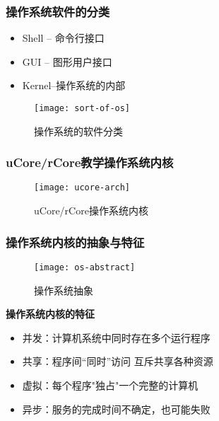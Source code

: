 %
%
%
%

\begin{frame}[plain]
	\frametitle{操作系统软件的分类}
		\begin{itemize}
		\item Shell -- 命令行接口
		\item GUI -- 图形用户接口
		\item Kernel--操作系统的内部
	\end{itemize}
	\begin{figure}
		\centering
		\texttt{[image: sort-of-os]}
		\caption{操作系统的软件分类}
	\end{figure}
\end{frame}

\begin{frame}[plain]
	\frametitle{uCore/rCore教学操作系统内核}
	\begin{figure}
		\centering
		\texttt{[image: ucore-arch]}
		\caption{uCore/rCore操作系统内核}
	\end{figure}
\end{frame}



\begin{frame}[plain]
	\frametitle{操作系统内核的抽象与特征}
	\begin{figure}
	\centering
	\texttt{[image: os-abstract]}
	\caption{操作系统抽象}
\end{figure} %
	\textbf{操作系统内核的特征}
	\begin{itemize}
		\item 并发：计算机系统中同时存在多个运行程序 %
		\item 共享：程序间“同时”访问 互斥共享各种资源 %
		\item 虚拟：每个程序"独占"一个完整的计算机 %
		\item 异步：服务的完成时间不确定，也可能失败
	\end{itemize}

\end{frame}


